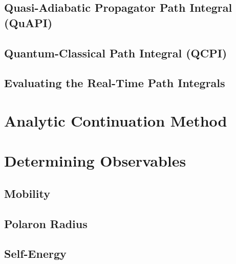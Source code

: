 \subsection{Quasi-Adiabatic Propagator Path Integral (QuAPI)}






\subsection{Quantum-Classical Path Integral (QCPI)}

\subsection{Evaluating the Real-Time Path Integrals}

\section{Analytic Continuation Method}

\section{Determining Observables}

\subsection{Mobility}

\subsection{Polaron Radius}

\subsection{Self-Energy}


